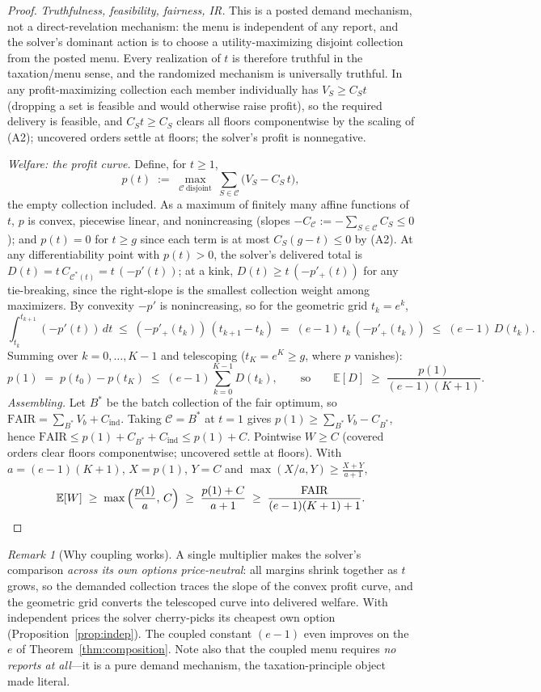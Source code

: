 \documentclass[11pt]{article}
\theoremstyle{remark}
\newtheorem{remark}{Remark}
\newcommand{\FAIR}{\mathrm{FAIR}}
\newcommand{\E}{\mathbb{E}}
\begin{document}
\begin{proof}
\emph{Truthfulness, feasibility, fairness, IR.} This is a posted demand
mechanism, not a direct-revelation mechanism: the menu is independent of
any report, and the solver's dominant action is to choose a
utility-maximizing disjoint collection from the posted menu. Every
realization of $t$ is therefore truthful in the taxation/menu sense, and
the randomized mechanism is universally truthful. In any profit-maximizing collection each member
individually has $V_S\ge C_S t$ (dropping a set is feasible and would
otherwise raise profit), so the required delivery is feasible, and
$C_St\ge C_S$ clears all floors componentwise by the scaling of (A2);
uncovered orders settle at floors; the solver's profit is nonnegative.

\emph{Welfare: the profit curve.} Define, for $t\ge1$,
\[
p(t)\;:=\;\max_{\mathcal C\ \mathrm{disjoint}}\ \sum_{S\in\mathcal C}
\big(V_S-C_S\,t\big),
\]
the empty collection included. As a maximum of finitely many affine
functions of $t$, $p$ is convex, piecewise linear, and nonincreasing
(slopes $-C_{\mathcal C}:=-\sum_{S\in\mathcal C}C_S\le0$); and $p(t)=0$
for $t\ge g$ since each term is at most $C_S(g-t)\le0$ by (A2). At any
differentiability point with $p(t)>0$, the solver's delivered total is
$D(t)=t\,C_{\mathcal C^\ast(t)}=t\,(-p'(t))$; at a kink,
$D(t)\ge t\,(-p'_+(t))$ for any tie-breaking, since the right-slope is
the smallest collection weight among maximizers. By convexity $-p'$ is
nonincreasing, so for the geometric grid $t_k=e^k$,
\[
\int_{t_k}^{t_{k+1}}(-p'(t))\,dt\;\le\;(-p'_+(t_k))\,(t_{k+1}-t_k)
\;=\;(e-1)\,t_k\,(-p'_+(t_k))\;\le\;(e-1)\,D(t_k).
\]
Summing over $k=0,\dots,K-1$ and telescoping
($t_K=e^K\ge g$, where $p$ vanishes):
\[
p(1)\;=\;p(t_0)-p(t_K)\;\le\;(e-1)\sum_{k=0}^{K-1}D(t_k),
\qquad\text{so}\qquad
\E[D]\;\ge\;\frac{p(1)}{(e-1)(K+1)} .
\]
\emph{Assembling.} Let $B^\ast$ be the batch collection of the
fair optimum, so $\FAIR=\sum_{B^\ast}V_b+C_{\mathrm{ind}}$. Taking
$\mathcal C=B^\ast$ at $t=1$ gives
$p(1)\ge\sum_{B^\ast}V_b-C_{B^\ast}$, hence
$\FAIR\le p(1)+C_{B^\ast}+C_{\mathrm{ind}}\le p(1)+C$. Pointwise
$W\ge C$ (covered orders clear floors componentwise; uncovered settle at
floors). With $a=(e-1)(K+1)$, $X=p(1)$, $Y=C$ and
$\max(X/a,Y)\ge\frac{X+Y}{a+1}$,
\[
\E[W]\;\ge\;\max\Big(\frac{p(1)}{a},\,C\Big)
\;\ge\;\frac{p(1)+C}{a+1}\;\ge\;\frac{\FAIR}{(e-1)(K+1)+1}.\qedhere
\]
\end{proof}

\begin{remark}[Why coupling works]\label{rem:coupling}
A single multiplier makes the solver's comparison \emph{across its own
options price-neutral}: all margins shrink together as $t$ grows, so the
demanded collection traces the slope of the convex profit curve, and the
geometric grid converts the telescoped curve into delivered welfare. With
independent prices the solver cherry-picks its cheapest own option
(Proposition~\ref{prop:indep}). The coupled constant $(e-1)$ even
improves on the $e$ of Theorem~\ref{thm:composition}. Note also that the
coupled menu requires \emph{no reports at all}---it is a pure demand
mechanism, the taxation-principle object made literal.
\end{remark}
\end{document}
